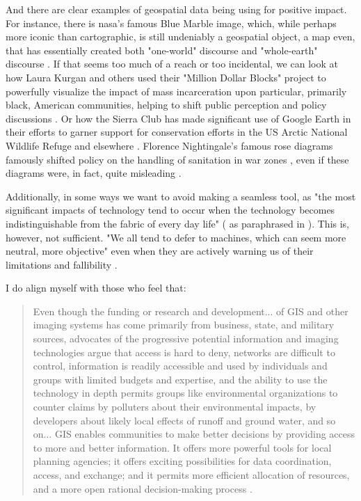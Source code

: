 And there are clear examples of geospatial data being using for positive impact. For instance, there is \ac{nasa}'s famous Blue Marble image, which, while perhaps more iconic than cartographic, is still undeniably a geospatial object, a map even, that has essentially created both "one-world" discourse and "whole-earth" discourse \cite{propenCartographicRepresentationConstruction2011}. If that seems too much of a reach or too incidental, we can look at how Laura Kurgan and others used their "Million Dollar Blocks" project to powerfully visualize the impact of mass incarceration upon particular, primarily black, American communities, helping to shift public perception and policy discussions \cite{kurganCloseDistanceMapping2013}. Or how the Sierra Club has made significant use of Google Earth in their efforts to garner support for conservation efforts in the US Arctic National Wildlife Refuge and elsewhere \cite{propenCartographicRepresentationConstruction2011}. Florence Nightingale's famous rose diagrams famously shifted policy on the handling of sanitation in war zones \cite{friendlyBriefHistoryData2008}, even if these diagrams were, in fact, quite misleading \cite{harfordDataDetectiveTen2021}.

Additionally, in some ways we want to avoid making a seamless tool, as "the most significant impacts of technology tend to occur when the technology becomes indistinguishable from the fabric of every day life" (\cite{weinerComputer21stCentury1991} as paraphrased in \cite{vereginComputerInnovationAdoption1994}). This is, however, not sufficient. "We all tend to defer to machines, which can seem more neutral, more objective" even when they are actively warning us of their limitations and fallibility \cite{eubanksAutomatingInequalityHow2018}.

I do align myself with those who feel that:

\blockquote{Even though the funding or research and development... of GIS and other imaging systems has come primarily from business, state, and military sources, advocates of the progressive potential information and imaging technologies argue that access is hard to deny, networks are difficult to control, information is readily accessible and used by individuals and groups with limited budgets and expertise, and the ability to use the technology in depth permits groups like environmental organizations to counter claims by polluters about their environmental impacts, by developers about likely local effects of runoff and ground water, and so on... GIS enables communities to make better decisions by providing access to more and better information. It offers more powerful tools for local planning agencies; it offers exciting possibilities for data coordination, access, and exchange; and it permits more efficient allocation of resources, and a more open rational decision-making process \cite{picklesRepresentationsElectronicAge1994}.} 

